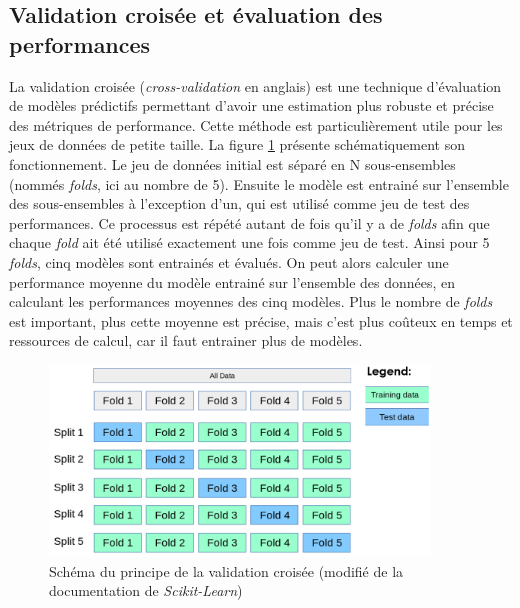 \subsection{Validation croisée et évaluation des performances}
La validation croisée (\textit{cross-validation }en anglais) est une technique d'évaluation de modèles prédictifs permettant d'avoir une estimation plus robuste et précise des métriques de performance. Cette méthode est particulièrement utile pour les jeux de données de petite taille. La figure \ref{fig:cross-val} présente schématiquement son fonctionnement. Le jeu de données initial est séparé en N sous-ensembles (nommés \textit{folds}, ici au nombre de 5). Ensuite le modèle est entrainé sur l'ensemble des sous-ensembles à l'exception d’un, qui est utilisé comme jeu de test des performances. Ce processus est répété autant de fois qu'il y a de \textit{folds} afin que chaque \textit{fold} ait été utilisé exactement une fois comme jeu de test. Ainsi pour 5 \textit{folds}, cinq modèles sont entrainés et évalués. On peut alors calculer une performance moyenne du modèle entrainé sur l'ensemble des données, en calculant les performances moyennes des cinq modèles. Plus le nombre de \textit{folds} est important, plus cette moyenne est précise, mais c'est plus coûteux en temps et ressources de calcul, car il faut entrainer plus de modèles.
\begin{figure}[!ht]
 \centering
 \includegraphics[width=0.9\textwidth]{figures/cross-val.png}
 \caption[Schéma validation-croisée]{Schéma du principe de la validation croisée (modifié de la documentation de \textit{Scikit-Learn})}
 \label{fig:cross-val}
\end{figure}
